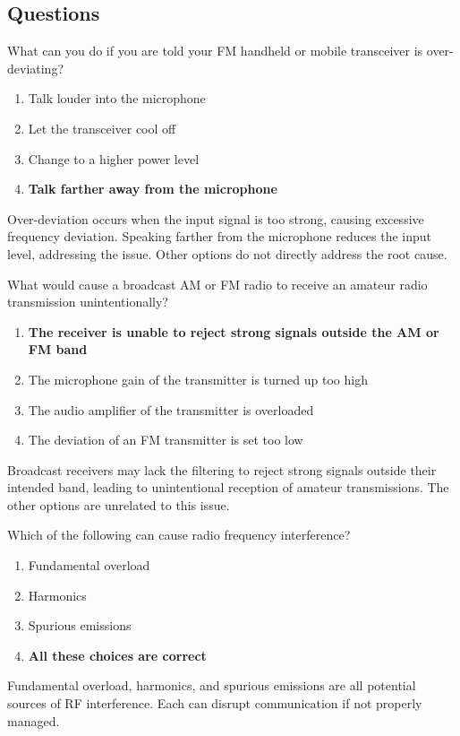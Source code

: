 \subsection*{Questions}
\begin{tcolorbox}[colback=gray!10!white,colframe=black!75!black,title={T7B01}]
    What can you do if you are told your FM handheld or mobile transceiver is over-deviating?
    \begin{enumerate}[label=\Alph*),noitemsep]
        \item Talk louder into the microphone
        \item Let the transceiver cool off
        \item Change to a higher power level
        \item \textbf{Talk farther away from the microphone}
    \end{enumerate}
\end{tcolorbox}
Over-deviation occurs when the input signal is too strong, causing excessive frequency deviation. Speaking farther from the microphone reduces the input level, addressing the issue. Other options do not directly address the root cause.


\begin{tcolorbox}[colback=gray!10!white,colframe=black!75!black,title={T7B02}]
    What would cause a broadcast AM or FM radio to receive an amateur radio transmission unintentionally?
    \begin{enumerate}[label=\Alph*),noitemsep]
        \item \textbf{The receiver is unable to reject strong signals outside the AM or FM band}
        \item The microphone gain of the transmitter is turned up too high
        \item The audio amplifier of the transmitter is overloaded
        \item The deviation of an FM transmitter is set too low
    \end{enumerate}
\end{tcolorbox}
Broadcast receivers may lack the filtering to reject strong signals outside their intended band, leading to unintentional reception of amateur transmissions. The other options are unrelated to this issue.


\begin{tcolorbox}[colback=gray!10!white,colframe=black!75!black,title={T7B03}]
    Which of the following can cause radio frequency interference?
    \begin{enumerate}[label=\Alph*),noitemsep]
        \item Fundamental overload
        \item Harmonics
        \item Spurious emissions
        \item \textbf{All these choices are correct}
    \end{enumerate}
\end{tcolorbox}
Fundamental overload, harmonics, and spurious emissions are all potential sources of RF interference. Each can disrupt communication if not properly managed.

